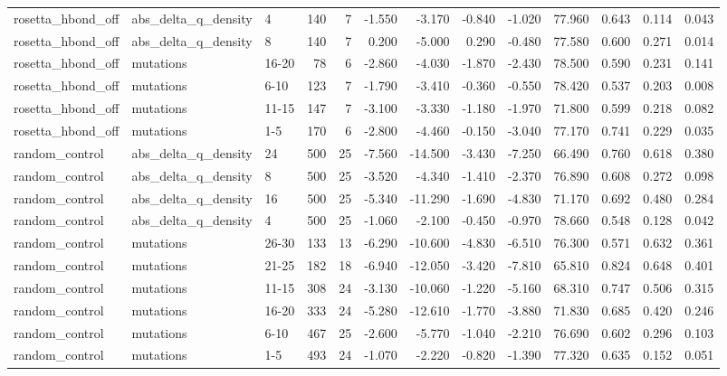 \begin{table}
\begin{tabular}{lllrrrrrrrrrr}
rosetta\_hbond\_off & abs\_delta\_q\_density & 4 & 140 & 7 & -1.550 & -3.170 & -0.840 & -1.020 & 77.960 & 0.643 & 0.114 & 0.043 \\
rosetta\_hbond\_off & abs\_delta\_q\_density & 8 & 140 & 7 & 0.200 & -5.000 & 0.290 & -0.480 & 77.580 & 0.600 & 0.271 & 0.014 \\
rosetta\_hbond\_off & mutations & 16-20 & 78 & 6 & -2.860 & -4.030 & -1.870 & -2.430 & 78.500 & 0.590 & 0.231 & 0.141 \\
rosetta\_hbond\_off & mutations & 6-10 & 123 & 7 & -1.790 & -3.410 & -0.360 & -0.550 & 78.420 & 0.537 & 0.203 & 0.008 \\
rosetta\_hbond\_off & mutations & 11-15 & 147 & 7 & -3.100 & -3.330 & -1.180 & -1.970 & 71.800 & 0.599 & 0.218 & 0.082 \\
rosetta\_hbond\_off & mutations & 1-5 & 170 & 6 & -2.800 & -4.460 & -0.150 & -3.040 & 77.170 & 0.741 & 0.229 & 0.035 \\
random\_control & abs\_delta\_q\_density & 24 & 500 & 25 & -7.560 & -14.500 & -3.430 & -7.250 & 66.490 & 0.760 & 0.618 & 0.380 \\
random\_control & abs\_delta\_q\_density & 8 & 500 & 25 & -3.520 & -4.340 & -1.410 & -2.370 & 76.890 & 0.608 & 0.272 & 0.098 \\
random\_control & abs\_delta\_q\_density & 16 & 500 & 25 & -5.340 & -11.290 & -1.690 & -4.830 & 71.170 & 0.692 & 0.480 & 0.284 \\
random\_control & abs\_delta\_q\_density & 4 & 500 & 25 & -1.060 & -2.100 & -0.450 & -0.970 & 78.660 & 0.548 & 0.128 & 0.042 \\
random\_control & mutations & 26-30 & 133 & 13 & -6.290 & -10.600 & -4.830 & -6.510 & 76.300 & 0.571 & 0.632 & 0.361 \\
random\_control & mutations & 21-25 & 182 & 18 & -6.940 & -12.050 & -3.420 & -7.810 & 65.810 & 0.824 & 0.648 & 0.401 \\
random\_control & mutations & 11-15 & 308 & 24 & -3.130 & -10.060 & -1.220 & -5.160 & 68.310 & 0.747 & 0.506 & 0.315 \\
random\_control & mutations & 16-20 & 333 & 24 & -5.280 & -12.610 & -1.770 & -3.880 & 71.830 & 0.685 & 0.420 & 0.246 \\
random\_control & mutations & 6-10 & 467 & 25 & -2.600 & -5.770 & -1.040 & -2.210 & 76.690 & 0.602 & 0.296 & 0.103 \\
random\_control & mutations & 1-5 & 493 & 24 & -1.070 & -2.220 & -0.820 & -1.390 & 77.320 & 0.635 & 0.152 & 0.051 \\
\bottomrule
\end{tabular}
\end{table}
